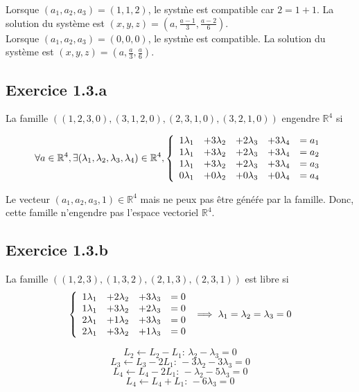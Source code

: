 \documentclass[]{book}
\theoremstyle{definition}
\newcommand{\bb}[1]{\mathbb{#1}}
\newcommand{\R}{\bb{R}}
\begin{document}
Lorsque $(a_1,a_2,a_3) = (1,1,2)$, le syst\`me est compatible car $2 = 1+1$. 
La solution du syst\`eme est $(x,y,z)=(a,\frac{a-1}{3},\frac{a-2}{6})$.\\

Lorsque $(a_1,a_2,a_3) = (0,0,0)$, le syst\`me est compatible. La solution du syst\`eme est $(x,y,z)=(a,\frac{a}{3},\frac{a}{6})$.\\


\subsection*{Exercice 1.3.a}
La famille $((1, 2, 3, 0), (3, 1, 2, 0), (2, 3, 1, 0), (3, 2, 1, 0))$ engendre $\R^4$ si

$$ \forall a \in \R^4, \exists (\lambda_1,\lambda_2,\lambda_3,\lambda_4) \in \R^4,
\left\{ 
\begin{array}{l l l l l}
  1\lambda_1 & +3\lambda_2 & +2\lambda_3 & +3\lambda_4  & = a_1 \\
  1\lambda_1 & +3\lambda_2 & +2\lambda_3 & +3\lambda_4  & = a_2 \\
  1\lambda_1 & +3\lambda_2 & +2\lambda_3 & +3\lambda_4  & = a_3 \\
  0\lambda_1 & +0\lambda_2 & +0\lambda_3 & +0\lambda_4  & = a_4 \\
\end{array}
\right. 
$$

Le vecteur $(a_1, a_2, a_3, 1) \in \R^4$ mais ne peux pas \^etre g\'en\'e\'re par la famille. Donc, cette famille n'engendre pas l'espace vectoriel $\R^4$.

\subsection*{Exercice 1.3.b}
La famille $((1, 2, 3), (1, 3, 2), (2, 1, 3), (2, 3, 1))$ est libre si
$$
\left\{ 
\begin{array}{l l l l}
  1\lambda_1 & +2\lambda_2 & +3\lambda_3   & = 0 \\
  1\lambda_1 & +3\lambda_2 & +2\lambda_3   & = 0 \\
  2\lambda_1 & +1\lambda_2 & +3\lambda_3   & = 0 \\
  2\lambda_1 & +3\lambda_2 & +1\lambda_3   & = 0 \\
\end{array}
\right. 
\implies
\lambda_1=\lambda_2=\lambda_3=0
$$

$$L_2 \leftarrow L_2-L_1:\, \lambda_2 - \lambda_3 = 0$$
$$L_3 \leftarrow L_3-2L_1:\, -3\lambda_2 - 3\lambda_3 = 0$$
$$L_4 \leftarrow L_4-2L_1:\, -\lambda_2 - 5\lambda_3 = 0$$
$$L_4 \leftarrow L_4+L_1:\, -6\lambda_3 = 0$$
\end{document}
